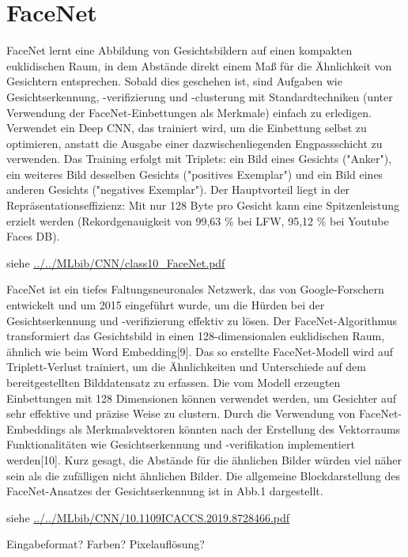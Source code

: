 %
%

\section{FaceNet}

\cite{Schroff:2015}


FaceNet lernt eine Abbildung von Gesichtsbildern auf einen kompakten euklidischen Raum, in dem Abstände direkt einem Maß für die Ähnlichkeit von Gesichtern entsprechen. Sobald dies geschehen ist, sind Aufgaben wie Gesichtserkennung, -verifizierung und -clusterung mit Standardtechniken (unter Verwendung der FaceNet-Einbettungen als Merkmale) einfach zu erledigen.
Verwendet ein Deep CNN, das trainiert wird, um die Einbettung selbst zu optimieren, anstatt die Ausgabe einer dazwischenliegenden Engpassschicht zu verwenden. Das Training erfolgt mit Triplets: ein Bild eines Gesichts ("Anker"), ein weiteres Bild desselben Gesichts ("positives Exemplar") und ein Bild eines anderen Gesichts ("negatives Exemplar"). Der Hauptvorteil liegt in der Repräsentationseffizienz: Mit nur 128 Byte pro Gesicht kann eine Spitzenleistung erzielt werden (Rekordgenauigkeit von 99,63 \% bei LFW, 95,12 \% bei Youtube Faces DB).

siehe \url{../../MLbib/CNN/class10_FaceNet.pdf}



FaceNet ist ein tiefes Faltungsneuronales Netzwerk, das von Google-Forschern entwickelt und um 2015 eingeführt wurde, um die Hürden bei der Gesichtserkennung und -verifizierung effektiv zu lösen. Der FaceNet-Algorithmus transformiert das Gesichtsbild in einen 128-dimensionalen euklidischen Raum, ähnlich wie beim Word Embedding[9]. Das so erstellte FaceNet-Modell wird auf Triplett-Verlust trainiert, um die Ähnlichkeiten und Unterschiede auf dem bereitgestellten Bilddatensatz zu erfassen. Die vom Modell erzeugten Einbettungen mit 128 Dimensionen können verwendet werden, um Gesichter auf sehr effektive und präzise Weise zu clustern. Durch die Verwendung von FaceNet-Embeddings als Merkmalsvektoren könnten nach der Erstellung des Vektorraums Funktionalitäten wie Gesichtserkennung und -verifikation implementiert werden[10]. Kurz gesagt, die Abstände für die ähnlichen Bilder würden viel näher sein als die zufälligen nicht ähnlichen Bilder. Die allgemeine Blockdarstellung des FaceNet-Ansatzes der Gesichtserkennung ist in Abb.1 dargestellt.

siehe \url{../../MLbib/CNN/10.1109ICACCS.2019.8728466.pdf}

Eingabeformat? Farben? Pixelauflösung?